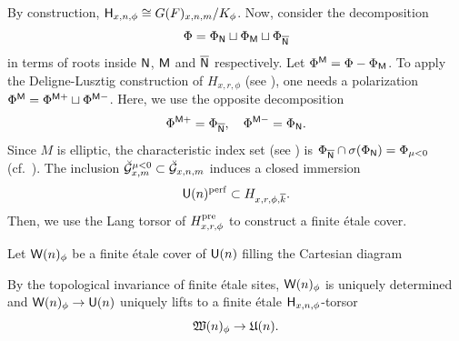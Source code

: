\documentclass[12pt,reqno]{amsart}
\begin{document}
By construction, ${\mathsf{H}}_{x, n, \phi} \cong G(F)_{x, n, m} / K_\phi$. Now, consider the decomposition
\[
    \Phi = \Phi_{{\mathsf{N}}} \sqcup \Phi_{{\mathsf{M}}} \sqcup \Phi_{{\mathsf{{\overline{N}}}}}
\]
in terms of roots inside ${\mathsf{N}}$, ${\mathsf{M}}$ and ${\mathsf{{\overline{N}}}}$ respectively. Let $\Phi^{{\mathsf{M}}} = \Phi - \Phi_{{\mathsf{M}}}$. To apply the Deligne-Lusztig construction of $H_{x, r, \phi}$ (see \cite[Definition 5.2]{Tak26_Yu}), one needs a polarization $\Phi^{{\mathsf{M}}} = \Phi^{{\mathsf{M}}+} \sqcup \Phi^{{\mathsf{M}}-}$. Here, we use the opposite decomposition 
\[
    \Phi^{{\mathsf{M}}+} = \Phi_{{\mathsf{{\overline{N}}}}}, \quad \Phi^{{\mathsf{M}}-} = \Phi_{{\mathsf{N}}}. 
\] 
Since $M$ is elliptic, the characteristic index set (see \cite[Definition 4.10]{Tak26_Yu}) is $\Phi_{{\mathsf{{\overline{N}}}}} \cap \sigma(\Phi_{{\mathsf{N}}}) = \Phi_{\mu < 0}$ (cf.\ \cite[Lemma 6.1]{Tak26_Yu}). The inclusion $\breve{{\mathcal{G}}}_{x, m}^{\mu < 0} \subset {\mathcal{\breve{G}}}_{x, n, m}$ induces a closed immersion 
\[
    {\mathsf{U}}(n)^{\operatorname{perf}} \subset H_{x, r, \phi, {\overline{k}}}. 
\]
Then, we use the Lang torsor of $H_{x, r, \phi}^{\operatorname{pre}}$ to construct a finite \'{e}tale cover. 

\begin{defi} \label{defi:reduction_of_specaff_even}
    Let ${\mathsf{W}}(n)_\phi$ be a finite \'{e}tale cover of ${\mathsf{U}}(n)$ filling the Cartesian diagram
    \begin{center}
    \end{center}
    By the topological invariance of finite \'{e}tale sites, ${\mathsf{W}}(n)_\phi$ is uniquely determined and ${\mathsf{W}}(n)_\phi \to {\mathsf{U}}(n)$ uniquely lifts to a finite \'{e}tale ${\mathsf{H}}_{x, n, \phi}$-torsor
    \[
        {\mathfrak{W}}(n)_\phi \to {\mathfrak{U}}(n). 
    \]
\end{defi}
\end{document}
